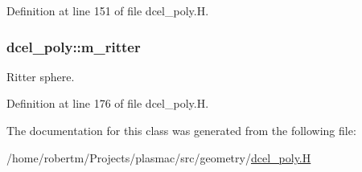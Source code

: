 Definition at line 151 of file dcel\+\_\+poly.\+H.

\subsubsection[{\texorpdfstring{m\+\_\+ritter}{m_ritter}}]{ dcel\+\_\+poly\+::m\+\_\+ritter\hspace{0.3cm}{\ttfamily [protected]}}\hypertarget{classdcel__poly_a10ce12ac725d513f47a8ca90c63b24d3}{}\label{classdcel__poly_a10ce12ac725d513f47a8ca90c63b24d3}


Ritter sphere. 



Definition at line 176 of file dcel\+\_\+poly.\+H.



The documentation for this class was generated from the following file\+:\begin{DoxyCompactItemize}
\item 
/home/robertm/\+Projects/plasmac/src/geometry/\hyperlink{dcel__poly_8H}{dcel\+\_\+poly.\+H}\end{DoxyCompactItemize}
